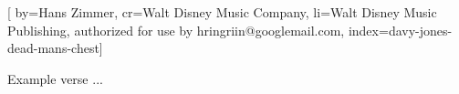 

[%
    by={Hans Zimmer},
    cr={Walt Disney Music Company},
    li={Walt Disney Music Publishing, authorized for use by hringriin@googlemail.com},
    index={davy-jones-dead-mans-chest}]


    \label{davy-jones-dead-mans-chest}

    \begin{center}
    \end{center}

    \beginverse\memorize[verse]
        Example verse ...
    \endverse

    \beginverse\replay[verse]
    \endverse

    \beginchorus\memorize[chorus]
    \endchorus

    \beginverse*\memorize[bridge]
    \endverse
\endsong
